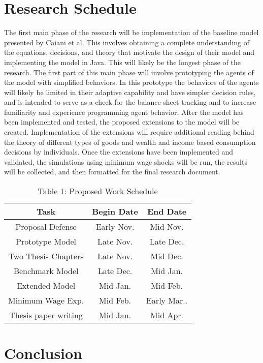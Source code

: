 \documentclass[11pt]{article}
\begin{document}
\section{Research Schedule}
\label{sec:schedule}
The first main phase of the research will be implementation of the baseline model
presented by Caiani et al. This involves obtaining a complete understanding of the
 equations, decisions, and theory that motivate the design of their model and
 implementing the model in Java. This will likely be the longest phase of the
 research. The first part of this main phase will involve prototyping the agents
 of the model with simplified behaviors. In this prototype the behaviors of the
 agents will likely be limited in their adaptive capability and have simpler
 decision rules, and is intended to serve as a check for the balance sheet tracking
 and to increase familiarity and experience programming agent behavior. After
 the model has been implemented and tested, the proposed extensions to the model
 will be created. Implementation of the extensions will require additional
 reading behind the theory of different types of goods and wealth and income
 based consumption decisions by individuals. Once the extensions have been
 implemented and validated, the simulations using minimum wage shocks will be run,
 the results will be collected, and then formatted for the final research document.

\begin{table}[htbp]
\centering
\begin{tabular}{|c||c|c|}
\hline
\bf Task & \bf Begin Date & \bf End Date\\\hline\hline
Proposal Defense & Early Nov. & Mid Nov.\\\hline
Prototype Model & Late Nov. & Late Dec.\\\hline
Two Thesis Chapters & Late Nov. & Mid Dec. \\\hline
Benchmark Model & Late Dec. & Mid Jan.\\\hline
Extended Model & Mid Jan. & Mid Feb.\\\hline
Minimum Wage Exp. & Mid Feb. & Early Mar..\\\hline
Thesis paper writing & Mid Jan. & Mid Apr. \\\hline
\end{tabular}
\caption{Table 1: Proposed Work Schedule}
\label{intro-tab1}
\end{table}


\section{Conclusion}
\label{sec:conclusion}
\end{document}
